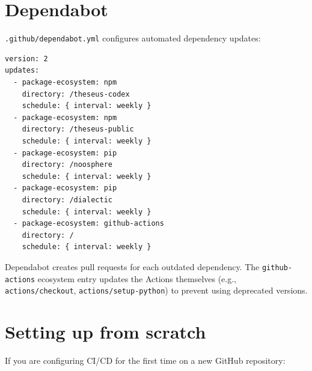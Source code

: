 \documentclass[11pt,letterpaper]{article}
\newcommand{\file}[1]{\texttt{#1}}
\newcommand{\cmd}[1]{\texttt{#1}}
\begin{document}
\section{Dependabot}

\file{.github/dependabot.yml} configures automated dependency updates:

\begin{lstlisting}
version: 2
updates:
  - package-ecosystem: npm
    directory: /theseus-codex
    schedule: { interval: weekly }
  - package-ecosystem: npm
    directory: /theseus-public
    schedule: { interval: weekly }
  - package-ecosystem: pip
    directory: /noosphere
    schedule: { interval: weekly }
  - package-ecosystem: pip
    directory: /dialectic
    schedule: { interval: weekly }
  - package-ecosystem: github-actions
    directory: /
    schedule: { interval: weekly }
\end{lstlisting}

Dependabot creates pull requests for each outdated dependency. The \cmd{github-actions} ecosystem entry updates the Actions themselves (e.g., \cmd{actions/checkout}, \cmd{actions/setup-python}) to prevent using deprecated versions.

\section{Setting up from scratch}

If you are configuring CI/CD for the first time on a new GitHub repository:
\end{document}
